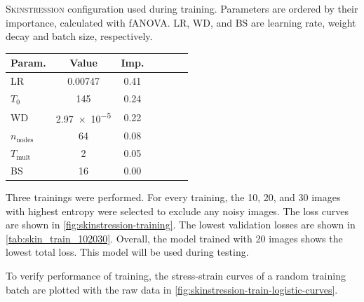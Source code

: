 \begin{margintable}
    \centering
    \caption[\textsc{Skinstression} configuration]{
        \textsc{Skinstression} configuration used during training.
        Parameters are ordered by their importance, calculated with fANOVA.
        LR, WD, and BS are learning rate, weight decay and batch size, respectively.
    }
    \label{tab:conf_skin_final}
    \begin{tabular}{l c c c c c c}
        \toprule
        Param.               & Value         & Imp. \\
        \midrule
        {LR}                 & 0.00747       & 0.41 \\
        {$T_0$}              & 145           & 0.24 \\
        {WD}                 & \num{2.97e-5} & 0.22 \\
        {$n_\mathrm{nodes}$} & 64            & 0.08 \\
        {$T_\mathrm{mult}$}  & 2             & 0.05 \\
        {BS}                 & 16            & 0.00 \\
        \bottomrule
    \end{tabular}
\end{margintable}

Three trainings were performed.
For every training, the 10, 20, and 30 images with highest entropy were selected to exclude any noisy images.
The loss curves are shown in \cref{fig:skinstression-training}.
The lowest validation losses are shown in \cref{tab:skin_train_102030}.
Overall, the model trained with 20 images shows the lowest total loss.
This model will be used during testing.

To verify performance of training, the stress-strain curves of a random training batch are plotted with the raw data in \cref{fig:skinstression-train-logistic-curves}.


